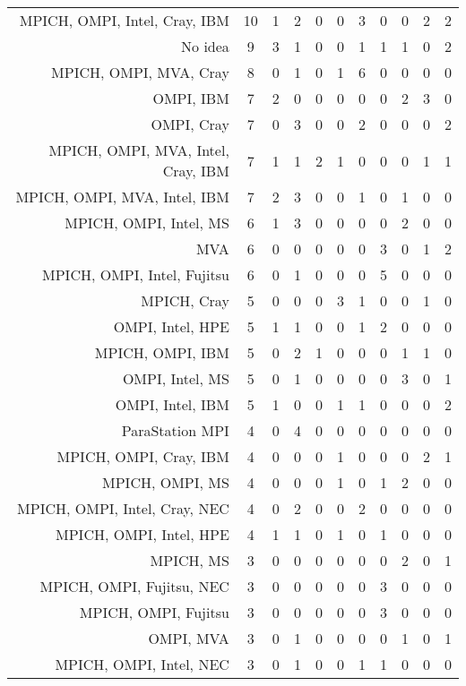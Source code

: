 {\begin{landscape}
\begin{longtable}[htb]{r|c|c|c|c|c|c|c|c|c|c}
{MPICH, OMPI, Intel, Cray, IBM} & 10 & 1 & 2 & 0 & 0 & 3 & 0 & 0 & 2 & 2 \\%
{No idea} & 9 & 3 & 1 & 0 & 0 & 1 & 1 & 1 & 0 & 2 \\%
{MPICH, OMPI, MVA, Cray} & 8 & 0 & 1 & 0 & 1 & 6 & 0 & 0 & 0 & 0 \\%
{OMPI, IBM} & 7 & 2 & 0 & 0 & 0 & 0 & 0 & 2 & 3 & 0 \\%
{OMPI, Cray} & 7 & 0 & 3 & 0 & 0 & 2 & 0 & 0 & 0 & 2 \\%
{MPICH, OMPI, MVA, Intel, Cray, IBM} & 7 & 1 & 1 & 2 & 1 & 0 & 0 & 0 & 1 & 1 \\%
{MPICH, OMPI, MVA, Intel, IBM} & 7 & 2 & 3 & 0 & 0 & 1 & 0 & 1 & 0 & 0 \\%
{MPICH, OMPI, Intel, MS} & 6 & 1 & 3 & 0 & 0 & 0 & 0 & 2 & 0 & 0 \\%
{MVA} & 6 & 0 & 0 & 0 & 0 & 0 & 3 & 0 & 1 & 2 \\%
{MPICH, OMPI, Intel, Fujitsu} & 6 & 0 & 1 & 0 & 0 & 0 & 5 & 0 & 0 & 0 \\%
{MPICH, Cray} & 5 & 0 & 0 & 0 & 3 & 1 & 0 & 0 & 1 & 0 \\%
{OMPI, Intel, HPE} & 5 & 1 & 1 & 0 & 0 & 1 & 2 & 0 & 0 & 0 \\%
{MPICH, OMPI, IBM} & 5 & 0 & 2 & 1 & 0 & 0 & 0 & 1 & 1 & 0 \\%
{OMPI, Intel, MS} & 5 & 0 & 1 & 0 & 0 & 0 & 0 & 3 & 0 & 1 \\%
{OMPI, Intel, IBM} & 5 & 1 & 0 & 0 & 1 & 1 & 0 & 0 & 0 & 2 \\%
{ParaStation MPI} & 4 & 0 & 4 & 0 & 0 & 0 & 0 & 0 & 0 & 0 \\%
{MPICH, OMPI, Cray, IBM} & 4 & 0 & 0 & 0 & 1 & 0 & 0 & 0 & 2 & 1 \\%
{MPICH, OMPI, MS} & 4 & 0 & 0 & 0 & 1 & 0 & 1 & 2 & 0 & 0 \\%
{MPICH, OMPI, Intel, Cray, NEC} & 4 & 0 & 2 & 0 & 0 & 2 & 0 & 0 & 0 & 0 \\%
{MPICH, OMPI, Intel, HPE} & 4 & 1 & 1 & 0 & 1 & 0 & 1 & 0 & 0 & 0 \\%
{MPICH, MS} & 3 & 0 & 0 & 0 & 0 & 0 & 0 & 2 & 0 & 1 \\%
{MPICH, OMPI, Fujitsu, NEC} & 3 & 0 & 0 & 0 & 0 & 0 & 3 & 0 & 0 & 0 \\%
{MPICH, OMPI, Fujitsu} & 3 & 0 & 0 & 0 & 0 & 0 & 3 & 0 & 0 & 0 \\%
{OMPI, MVA} & 3 & 0 & 1 & 0 & 0 & 0 & 0 & 1 & 0 & 1 \\%
{MPICH, OMPI, Intel, NEC} & 3 & 0 & 1 & 0 & 0 & 1 & 1 & 0 & 0 & 0 \\%

\end{longtable}
\end{landscape}}
